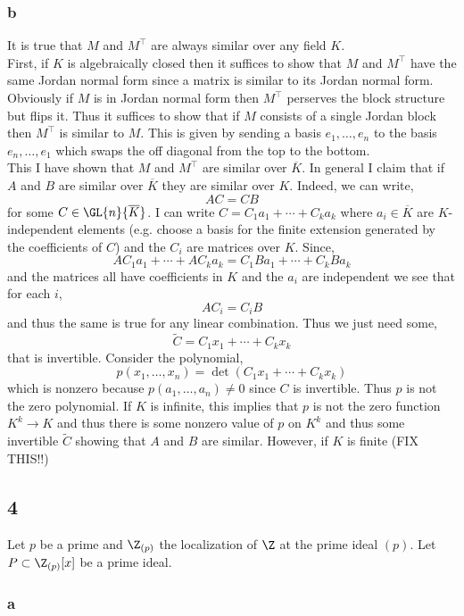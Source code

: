 \documentclass[12pt]{article}
\begin{document}
\subsubsection{b}

It is true that $M$ and $M^\top$ are always similar over any field $K$.
\bigskip\\
First, if $K$ is algebraically closed then it suffices to show that $M$ and $M^\top$ have the same Jordan normal form since a matrix is similar to its Jordan normal form. Obviously if $M$ is in Jordan normal form then $M^\top$ perserves the block structure but flips it. Thus it suffices to show that if $M$ consists of a single Jordan block then $M^\top$ is similar to $M$. This is given by sending a basis $e_1, \dots, e_n$ to the basis $e_n, \dots, e_1$ which swaps the off diagonal from the top to the bottom. 
\bigskip\\
This I have shown that $M$ and $M^\top$ are similar over $\overline{K}$. In general I claim that if $A$ and $B$ are similar over $\overline{K}$ they are similar over $K$. Indeed, we can write,
\[ A C = C B \]
for some $C \in \GL{n}{\overline{K}}$. I can write $C = C_1 a_1 + \cdots + C_k a_k$ where $a_i \in \overline{K}$ are $K$-independent elements (e.g. choose a basis for the finite extension generated by the coefficients of $C$) and the $C_i$ are matrices over $K$. Since,
\[ A C_1 a_1 + \cdots + A C_k a_k = C_1 B a_1 + \cdots + C_k B a_k \]
and the matrices all have coefficients in $K$ and the $a_i$ are independent we see that for each $i$,
\[ A C_i = C_i B \]
and thus the same is true for any linear combination. Thus we just need some,
\[ \tilde{C} = C_1 x_1 + \cdots + C_k x_k \]
that is invertible. Consider the polynomial,
\[ p(x_1, \dots, x_n) = \det{(C_1 x_1 + \cdots + C_k x_k)} \]
which is nonzero because $p(a_1, \dots, a_n) \neq 0$ since $C$ is invertible. Thus $p$ is not the zero polynomial. If $K$ is infinite, this implies that $p$ is not the zero function $K^k \to K$ and thus there is some nonzero value of $p$ on $K^k$ and thus some invertible $\tilde{C}$ showing that $A$ and $B$ are similar. However, if $K$ is finite (FIX THIS!!)

\subsection{4}

Let $p$ be a prime and $\Z_{(p)}$ the localization of $\Z$ at the prime ideal $(p)$. Let $P \subset \Z_{(p)}[x]$ be a prime ideal.

\subsubsection{a}
\end{document}
